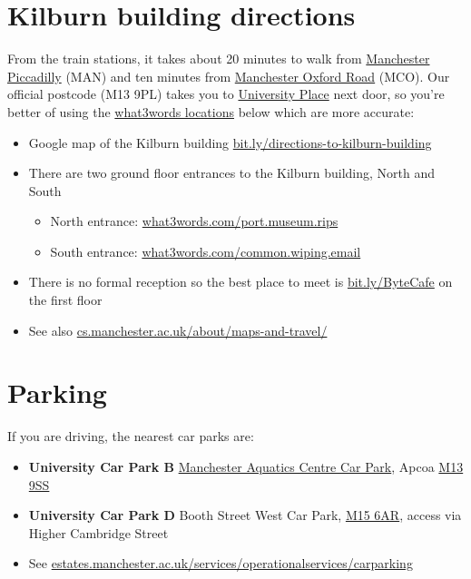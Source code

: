\documentclass[
  12pt,
]{book}
\providecommand{\tightlist}{%
  \setlength{\itemsep}{0pt}\setlength{\parskip}{0pt}}
\begin{document}
\hypertarget{kilburn-building-directions}{%
\section{Kilburn building directions}\label{kilburn-building-directions}}

From the train stations, it takes about 20 minutes to walk from \href{https://www.nationalrail.co.uk/stations_destinations/man.aspx}{Manchester Piccadilly} (MAN) and ten minutes from \href{https://www.nationalrail.co.uk/stations/mco/details.aspx}{Manchester Oxford Road} (MCO). Our official postcode (M13 9PL) takes you to \href{http://www.conference.manchester.ac.uk/venues/search/details/?property=10}{University Place} next door, so you're better of using the \href{https://www.bbc.co.uk/news/uk-england-49319760}{what3words locations} \citep{what3words} below which are more accurate:

\begin{itemize}
\tightlist
\item
  Google map of the Kilburn building \href{http://bit.ly/directions-to-kilburn-building}{bit.ly/directions-to-kilburn-building}
\item
  There are two ground floor entrances to the Kilburn building, North and South

  \begin{itemize}
  \tightlist
  \item
    North entrance: \href{https://what3words.com/port.museum.rips}{what3words.com/port.museum.rips}
  \item
    South entrance: \href{https://what3words.com/common.wiping.email}{what3words.com/common.wiping.email}
  \end{itemize}
\item
  There is no formal reception so the best place to meet is \href{http://bit.ly/ByteCafe}{bit.ly/ByteCafe} on the first floor
\item
  See also \href{https://www.cs.manchester.ac.uk/about/maps-and-travel/}{cs.manchester.ac.uk/about/maps-and-travel/}
\end{itemize}

\hypertarget{parking}{%
\section{Parking}\label{parking}}

If you are driving, the nearest car parks are:

\begin{itemize}
\tightlist
\item
  \textbf{University Car Park B} \href{https://www.apcoa.co.uk/parking-in/manchester/aquatics-centre/}{Manchester Aquatics Centre Car Park}, Apcoa \href{http://maps.google.co.uk/maps?q=M13+9SS}{M13 9SS}
\item
  \textbf{University Car Park D} Booth Street West Car Park, \href{http://maps.google.co.uk/maps?q=M15+6AR}{M15 6AR}, access via Higher Cambridge Street
\item
  See \href{https://www.estates.manchester.ac.uk/services/operationalservices/carparking/}{estates.manchester.ac.uk/services/operationalservices/carparking}
\end{itemize}
\end{document}
